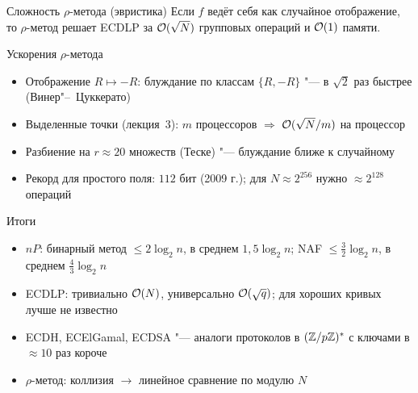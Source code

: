 \documentclass{ca-slides}
\begin{document}
\begin{theoremframe}{Сложность $\rho$-метода (эвристика)}
  Если $f$ ведёт себя как случайное отображение, то $\rho$-метод решает ECDLP за
  $\mathcal{O}(\sqrt N)$ групповых операций и $\mathcal{O}(1)$ памяти.
\end{theoremframe}

\begin{canvasframe}{Ускорения $\rho$-метода}
  \begin{itemize}
    \item Отображение $R \mapsto -R$: блуждание по классам $\{R, -R\}$ "--- в $\sqrt 2$ раз
      быстрее (Винер"--~Цуккерато)
    \item Выделенные точки (лекция~3): $m$ процессоров $\Rightarrow$ $\mathcal{O}(\sqrt N / m)$ на процессор
    \item Разбиение на $r \approx 20$ множеств (Теске) "--- блуждание ближе к случайному
    \item Рекорд для простого поля: $112$ бит (2009 г.); для $N \approx 2^{256}$ нужно
      $\approx 2^{128}$ операций
  \end{itemize}
  \penspace[0.25\textheight]
\end{canvasframe}

\begin{canvasframe}{Итоги}
  \begin{itemize}
    \item $nP$: бинарный метод $\le 2\log_2 n$, в среднем $1{,}5\log_2 n$;
      NAF $\le \frac32 \log_2 n$, в среднем $\frac43 \log_2 n$
    \item ECDLP: тривиально $\mathcal{O}(N)$, универсально $\mathcal{O}(\sqrt q)$; для хороших кривых
      лучше не известно
    \item ECDH, ECElGamal, ECDSA "--- аналоги протоколов в $(\mathbb{Z}/p\mathbb{Z})^{*}$ с ключами в $\approx 10$ раз
      короче
    \item $\rho$-метод: коллизия $\to$ линейное сравнение по модулю $N$
  \end{itemize}
  \penspace[0.25\textheight]
\end{canvasframe}
\end{document}

